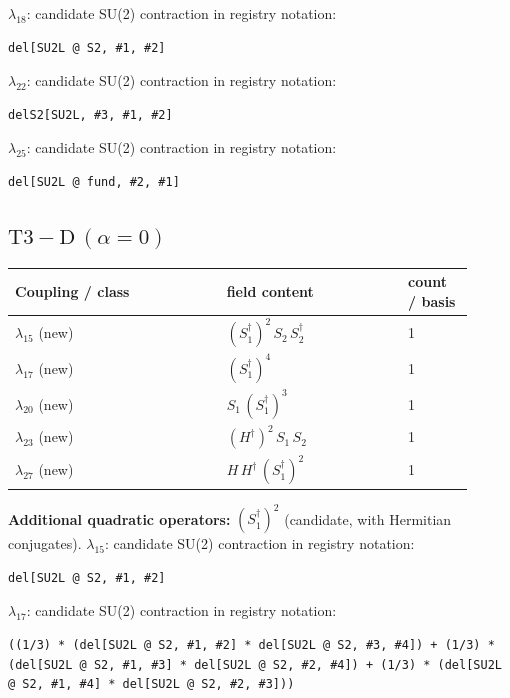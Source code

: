 \documentclass[9pt,a4paper]{article}
\begin{document}
\textbf{$ \lambda_{18} $}: candidate SU(2) contraction in registry notation:
\begin{lstlisting}[mathescape=true]
del[SU2L @ S2, #1, #2]
\end{lstlisting}

\textbf{$ \lambda_{22} $}: candidate SU(2) contraction in registry notation:
\begin{lstlisting}[mathescape=true]
delS2[SU2L, #3, #1, #2]
\end{lstlisting}

\textbf{$ \lambda_{25} $}: candidate SU(2) contraction in registry notation:
\begin{lstlisting}[mathescape=true]
del[SU2L @ fund, #2, #1]
\end{lstlisting}

\subsection*{$ \mathrm{T3-D}\,(\alpha=0) $}
\begin{longtable}{@{}p{0.42\linewidth}p{0.36\linewidth}p{0.13\linewidth}@{}}
\toprule
Coupling / class & field content & count / basis\\
\midrule
\endhead
$\lambda_{15}$ (new) & $\left(S_1^\dagger\right)^{2}\, S_2\, S_2^\dagger$ & 1 \\
$\lambda_{17}$ (new) & $\left(S_1^\dagger\right)^{4}$ & 1 \\
$\lambda_{20}$ (new) & $S_1\, \left(S_1^\dagger\right)^{3}$ & 1 \\
$\lambda_{23}$ (new) & $\left(H^\dagger\right)^{2}\, S_1\, S_2$ & 1 \\
$\lambda_{27}$ (new) & $H\, H^\dagger\, \left(S_1^\dagger\right)^{2}$ & 1 \\
\bottomrule
\end{longtable}
\textbf{Additional quadratic operators:}
$\left(S_1^\dagger\right)^{2}$ (candidate, with Hermitian conjugates).
\textbf{$ \lambda_{15} $}: candidate SU(2) contraction in registry notation:
\begin{lstlisting}[mathescape=true]
del[SU2L @ S2, #1, #2]
\end{lstlisting}

\textbf{$ \lambda_{17} $}: candidate SU(2) contraction in registry notation:
\begin{lstlisting}[mathescape=true]
((1/3) * (del[SU2L @ S2, #1, #2] * del[SU2L @ S2, #3, #4]) + (1/3) * (del[SU2L @ S2, #1, #3] * del[SU2L @ S2, #2, #4]) + (1/3) * (del[SU2L @ S2, #1, #4] * del[SU2L @ S2, #2, #3]))
\end{lstlisting}
\end{document}
